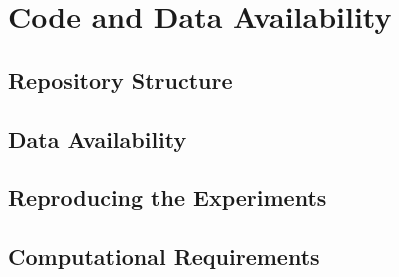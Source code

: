 
\chapter{Code and Data Availability}
\label{app:code}

\section{Repository Structure}
\label{sec:app-repo}


\section{Data Availability}
\label{sec:app-data}


\section{Reproducing the Experiments}
\label{sec:app-reproduce}


\section{Computational Requirements}
\label{sec:app-compute}

